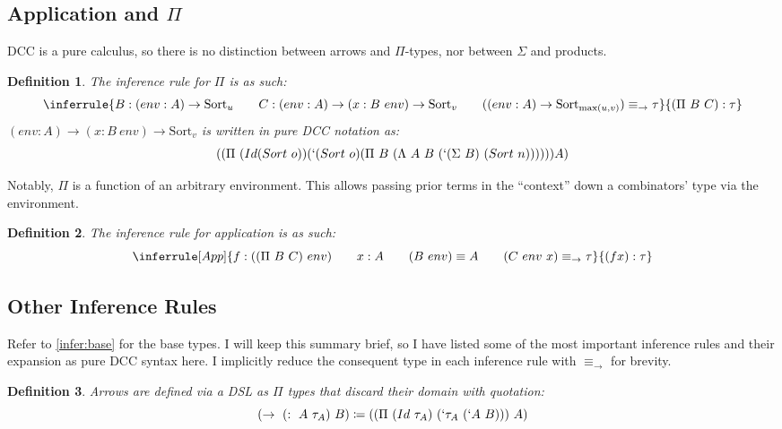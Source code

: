 \documentclass{article}
\newtheorem{definition}{Definition}
\newcommand{\arr}{\rightarrow}
\newcommand{\sort}[1]{\text{Sort}_{#1}}
\begin{document}
\subsection{Application and \(\Pi\)}

DCC is a pure calculus, so there is no distinction between arrows and \(\Pi\)-types, nor between \(\Sigma\) and products.

\begin{definition}
  The inference rule for \(\Pi\) is as such:
  \begin{equation}
  \inferrule
  { B : (env : A) \arr \sort{u} \qquad C : (env : A) \arr (x : B\ env) \arr \sort{v} \qquad ((env : A) \arr \sort{\max(u, v)}) \equiv_{\arr} \tau}
  { (\Pi\ B\ C) : \tau}
\end{equation}
\((env : A) \arr (x : B\ env) \arr \sort{v}\) is written in pure DCC notation as:
\begin{equation}
  ((\Pi\ (Id (Sort\ o)) (`(Sort\ o) (\Pi\ B\ (\Lambda\ A\ B\ (`(\Sigma\ B)\ (Sort\ n)))))) A)
\end{equation}
\end{definition}

Notably, \(\Pi\) is a function of an arbitrary environment. This allows passing prior terms in the ``context'' down a combinators' type via the environment.

\begin{definition}
  The inference rule for application is as such:
  \begin{equation}
    \inferrule[App]
    { f : ((\Pi\ B\ C)\ env) \qquad x : A \qquad (B\ env) \equiv A \qquad (C\ env\ x) \equiv_{\arr} \tau}
    { (f x) : \tau}
  \end{equation}
\end{definition}

\subsection{Other Inference Rules}

Refer to \ref{infer:base} for the base types. I will keep this summary brief, so I have listed some of the most important inference rules and their expansion as pure DCC syntax here. I implicitly reduce the consequent type in each inference rule with \(\equiv_{\arr}\) for brevity.

\begin{definition}\label{def:arr}
  Arrows are defined via a DSL as \(\Pi\) types that discard their domain with quotation:
  \begin{equation}
    (\rightarrow\ (:\ A\ \tau_A)\ B) \coloneq ((\Pi\ (Id\ \tau_A)\ (` \tau_A\ (`A\ B)))\ A)
  \end{equation}
\end{definition}
\end{document}
